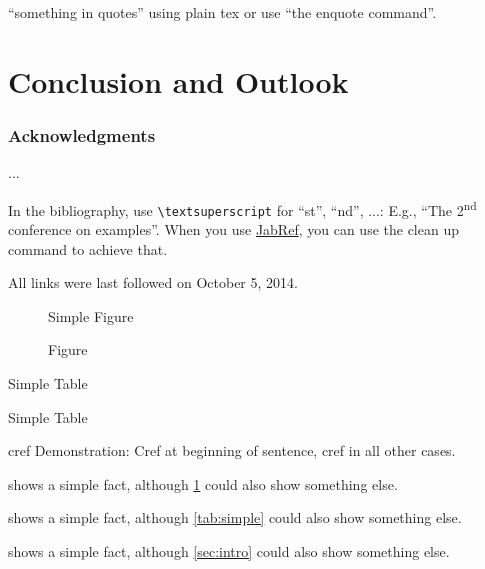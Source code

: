 \documentclass[runningheads,a4paper]{llncs}
\begin{document}
``something in quotes'' using plain tex or use \enquote{the enquote command}.

\section{Conclusion and Outlook}

\subsubsection*{Acknowledgments}
...

In the bibliography, use \texttt{\textbackslash textsuperscript} for ``st'', ``nd'', ...:
E.g., \enquote{The 2\textsuperscript{nd} conference on examples}.
When you use \href{http://www.jabref.org}{JabRef}, you can use the clean up command to achieve that.




All links were last followed on October 5, 2014.


\begin{figure}
	Simple Figure
	\caption{ Figure}
	\label{fig:simple}
\end{figure}

\begin{table}
	\caption{Simple Table}
	
	\label{tab:simple}
	Simple Table
\end{table}
cref Demonstration: Cref at beginning of sentence, cref in all other cases.

 shows a simple fact, although \cref{fig:simple} could also show something else.

 shows a simple fact, although \cref{tab:simple} could also show something else.

 shows a simple fact, although \cref{sec:intro} could also show something else.
\end{document}
